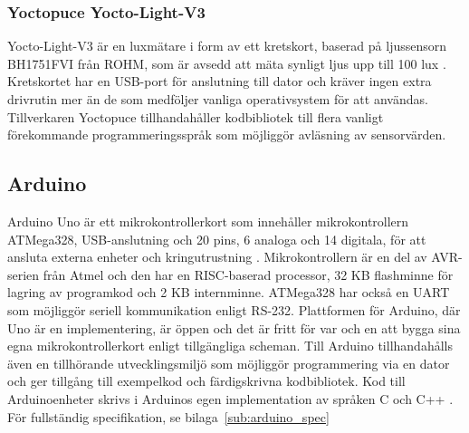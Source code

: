     \subsubsection{Yoctopuce Yocto-Light-V3} %
    \label{sub:yocto}
        Yocto-Light-V3 är en luxmätare i form av ett kretskort, baserad på ljussensorn BH1751FVI från ROHM, som är avsedd att mäta synligt ljus upp till 100 lux \cite{yocto}. Kretskortet har en USB-port för anslutning till dator och kräver ingen extra drivrutin mer än de som medföljer vanliga operativsystem för att användas. Tillverkaren Yoctopuce tillhandahåller kodbibliotek till flera vanligt förekommande programmeringsspråk som möjliggör avläsning av sensorvärden.
        \newpage
        \subsection{Arduino} %
        \label{ssub:arduino_uno}
            Arduino Uno är ett mikrokontrollerkort som innehåller mikrokontrollern ATMega328, USB-anslutning och 20 pins, 6 analoga och 14 digitala, för att ansluta externa enheter och kringutrustning \cite[kap.~1]{ard_internals}. Mikrokontrollern är en del av AVR-serien från Atmel och den har en RISC-baserad processor, 32 KB flashminne för lagring av programkod och 2 KB internminne. ATMega328 har också en UART som möjliggör seriell kommunikation enligt RS-232. Plattformen för Arduino, där Uno är en implementering, är öppen och det är fritt för var och en att bygga sina egna mikrokontrollerkort enligt tillgängliga scheman. Till Arduino tillhandahålls även en tillhörande utvecklingsmiljö som möjliggör programmering via en dator och ger tillgång till exempelkod och färdigskrivna kodbibliotek. Kod till Arduinoenheter skrivs i Arduinos egen implementation av språken C och C++ \cites[kap.~2]{ard_c}{ard_cplusplus}. För fullständig specifikation, se bilaga~\ref{sub:arduino_spec}

